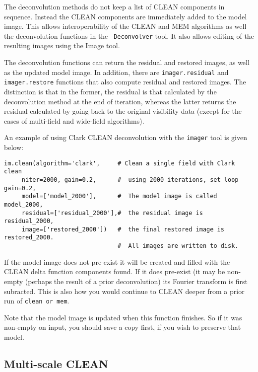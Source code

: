 The deconvolution methods do not keep a list of CLEAN components in
sequence.  Instead the CLEAN components are immediately added to the
model image.  This allows interoperability of the CLEAN and MEM
algorithms as well the deconvolution functions in the {\tt
Deconvolver} tool.  It also allows editing of the resulting images
using the Image tool.

The deconvolution functions can return the residual and restored
images, as well as the updated model image. In addition, there are
{\tt imager.residual} and {\tt imager.restore} functions that also
compute residual and restored images. The distinction is that in the
former, the residual is that calculated by the deconvolution method at
the end of iteration, whereas the latter returns the residual
calculated by going back to the original visibility data (except for
the cases of multi-field and wide-field algorithms).

An example of using Clark CLEAN deconvolution with the {\tt imager}
tool is given below:

\small
\begin{verbatim}
im.clean(algorithm='clark',     # Clean a single field with Clark clean
     niter=2000, gain=0.2,      #  using 2000 iterations, set loop gain=0.2,
     model=['model_2000'],      #  The model image is called model_2000,
     residual=['residual_2000'],#  the residual image is residual_2000,
     image=['restored_2000'])   #  the final restored image is restored_2000.
                                #  All images are written to disk.
\end{verbatim}
\normalsize

If the model image does not pre-exist it will be created and filled
with the CLEAN delta function components found.  If it does pre-exist
(it may be non-empty (perhaps the result of a prior deconvolution) its
Fourier transform is first subracted.  This is also how you would
continue to CLEAN deeper from a prior run of {\tt clean or mem}.

Note that the model image is updated when this function finishes.
So if it was non-empty on input, you should save a copy first,
if you wish to preserve that model.

\subsection{Multi-scale CLEAN}
\label{section:imtool.decon.msclean}

